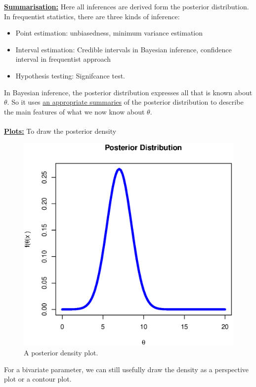 \documentclass[lecture,12pt,]{pcms-l}
\numberwithin{section}{chapter}
\numberwithin{equation}{chapter}
\theoremstyle{plain}
\theoremstyle{definition}
\theoremstyle{definition}
\begin{document}
\underline{\bf{Summarisation:}} Here all inferences are derived form the posterior distribution. In frequentist statistics, there are three kinds of inference:
\begin{itemize}
\item Point estimation: unbiasedness, minimum variance estimation
\item Interval estimation: Credible intervals in Bayesian inference, confidence interval in frequentist approach
\item Hypothesis testing: Signifcance test.
\end{itemize}
In Bayesian inference, the posterior distribution expresses all that is known about $\theta$. So it uses \underline{an appropriate summaries} of the posterior distribution to describe the main features of what we now know about $\theta$.
\\
\\
\underline{\bf{Plots:}} To draw the posterior density 
\begin{figure}
 \includegraphics[scale=0.4]{posterior}%
  \caption{A posterior density plot. }
\label{fig:posterior}
\end{figure} 
\newpage
For a bivariate parameter, we can still usefully draw the density as a perspective plot or a contour plot.
\end{document}
